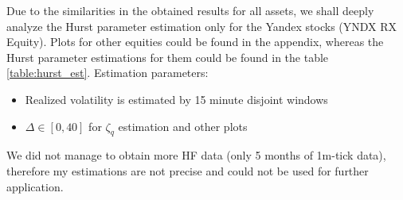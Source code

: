         Due to the similarities in the obtained results for all assets, we shall deeply analyze the Hurst parameter estimation only for the 
        Yandex stocks (YNDX RX Equity). Plots for other equities could be found in the appendix, whereas the Hurst parameter estimations for them 
        could be found in the table \ref{table:hurst_est}. 
        Estimation parameters:
        \begin{itemize}
            \item Realized volatility is estimated by 15 minute disjoint windows
            \item $\Delta \in [0, 40]$ for $\zeta_q$ estimation and other plots
        \end{itemize}

        \begin{nb}
            We did not manage to obtain more HF data (only 5 months of 1m-tick data), therefore my estimations are not precise and could 
            not be used for further application.
        \end{nb}

